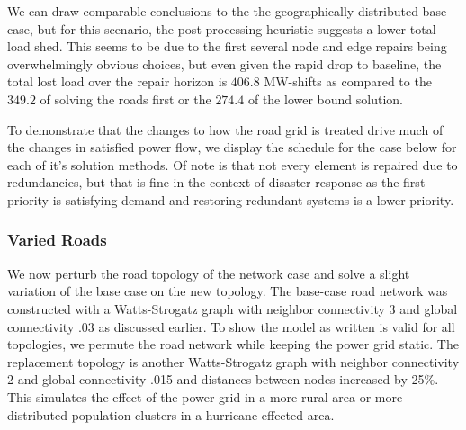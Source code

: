 \documentclass{article}
\begin{document}
	We can draw comparable conclusions to the the geographically distributed base case, but for this scenario, the post-processing heuristic suggests a lower total load shed. This seems to be due to the first several node and edge repairs being overwhelmingly obvious choices, but even given the rapid drop to baseline, the total lost load over the repair horizon is $406.8$ MW-shifts as compared to the $349.2$ of solving the roads first or the $274.4$ of the lower bound solution.
	
	To demonstrate that the changes to how the road grid is treated drive much of the changes in satisfied power flow, we display the schedule for the case below for each of it's solution methods. Of note is that not every element is repaired due to redundancies, but that is fine in the context of disaster response as the first priority is satisfying demand and restoring redundant systems is a lower priority. 
	
	 \begin{table}[htbp]
		\centering
		\caption{Repair Schedule by interaction method}
		\label{time}
	\end{table}
	\subsubsection{Varied Roads}
	We now perturb the road topology of the network case and solve a slight variation of the base case on the new topology. The base-case road network was constructed with a Watts-Strogatz graph with neighbor connectivity 3 and global connectivity .03 as discussed earlier. To show the model as written is valid for all topologies, we permute the road network while keeping the power grid static. The replacement topology is another Watts-Strogatz graph with neighbor connectivity 2 and global connectivity .015 and distances between nodes increased by 25\%. This simulates the effect of the power grid in a more rural area or more distributed population clusters in a hurricane effected area.
	
\end{document}
